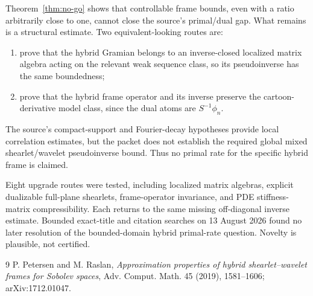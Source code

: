 \documentclass[11pt]{article}
\begin{document}
Theorem~\ref{thm:no-go} shows that controllable frame bounds, even with a
ratio arbitrarily close to one, cannot close the source's primal/dual gap.
What remains is a structural estimate.  Two equivalent-looking routes are:
\begin{enumerate}
\item prove that the hybrid Gramian belongs to an inverse-closed localized
matrix algebra acting on the relevant weak sequence class, so its
pseudoinverse has the same boundedness;
\item prove that the hybrid frame operator and its inverse preserve the
cartoon-derivative model class, since the dual atoms are $S^{-1}\phi_n$.
\end{enumerate}
The source's compact-support and Fourier-decay hypotheses provide local
correlation estimates, but the packet does not establish the required global
mixed shearlet/wavelet pseudoinverse bound.  Thus no primal rate for the
specific hybrid frame is claimed.

Eight upgrade routes were tested, including localized matrix algebras,
explicit dualizable full-plane shearlets, frame-operator invariance, and PDE
stiffness-matrix compressibility.  Each returns to the same missing
off-diagonal inverse estimate.  Bounded exact-title and citation searches on
13 August 2026 found no later resolution of the bounded-domain hybrid
primal-rate question.  Novelty is plausible, not certified.

\begin{thebibliography}{9}
P. Petersen and M. Raslan,
\emph{Approximation properties of hybrid shearlet--wavelet frames for
Sobolev spaces}, Adv. Comput. Math. 45 (2019), 1581--1606;
arXiv:1712.01047.
\end{thebibliography}
\end{document}
